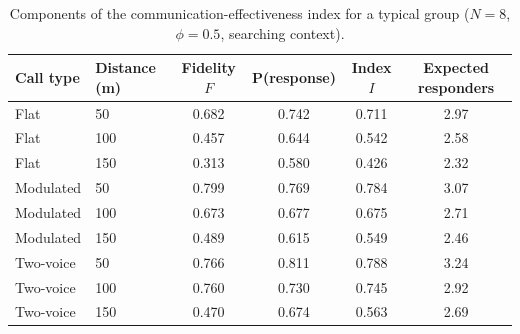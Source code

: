 \begin{table}[!ht]
\centering
\caption{Components of the communication-effectiveness index for a typical group ($N=8$, $\phi=0.5$, searching context).}
\label{tab:p4comp}
\small
\begin{tabular}{llcccc}
\toprule
Call type & Distance (m) & Fidelity $F$ & P(response) & Index $I$ & Expected responders \\
\midrule
Flat & 50 & 0.682 & 0.742 & 0.711 & 2.97 \\
Flat & 100 & 0.457 & 0.644 & 0.542 & 2.58 \\
Flat & 150 & 0.313 & 0.580 & 0.426 & 2.32 \\
Modulated & 50 & 0.799 & 0.769 & 0.784 & 3.07 \\
Modulated & 100 & 0.673 & 0.677 & 0.675 & 2.71 \\
Modulated & 150 & 0.489 & 0.615 & 0.549 & 2.46 \\
Two-voice & 50 & 0.766 & 0.811 & 0.788 & 3.24 \\
Two-voice & 100 & 0.760 & 0.730 & 0.745 & 2.92 \\
Two-voice & 150 & 0.470 & 0.674 & 0.563 & 2.69 \\
\bottomrule
\end{tabular}
\end{table}